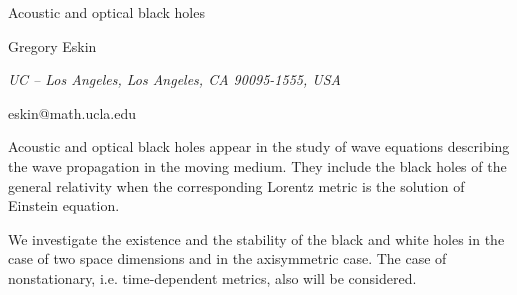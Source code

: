 \documentclass[10pt,a4paper]{article}
\begin{document}
\begin{center}

{\Large Acoustic and optical black holes}

\bigskip

{\sc Gregory Eskin}

{\small\it UC -- Los Angeles, Los Angeles, CA 90095-1555, USA}

{\small\rm eskin@math.ucla.edu}


\end{center}

\bigskip


Acoustic and optical black holes  appear in the study of  wave equations 
describing the wave propagation in the moving medium.  They include the black holes
of the general relativity when the corresponding Lorentz metric is the solution
of Einstein equation.

We investigate the existence and the stability of the black and white holes
in the case of two space dimensions and in the axisymmetric case. 
The case of nonstationary, i.e. time-dependent metrics, also will be
considered.  
\end{document}
